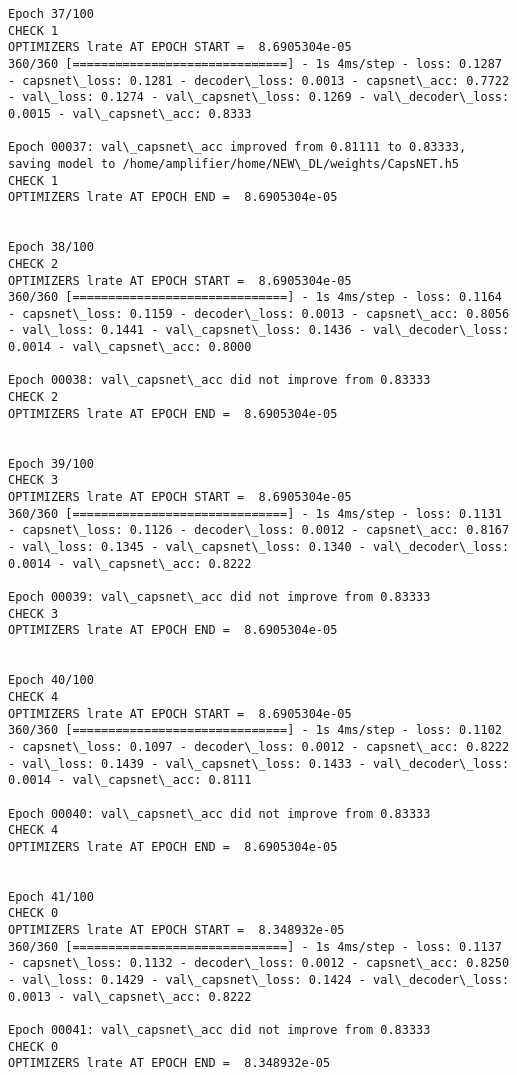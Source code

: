 \documentclass[11pt]{article}
\begin{document}
\begin{Verbatim}[commandchars=\\\{\}]
Epoch 37/100
CHECK 1
OPTIMIZERS lrate AT EPOCH START =  8.6905304e-05
360/360 [==============================] - 1s 4ms/step - loss: 0.1287 - capsnet\_loss: 0.1281 - decoder\_loss: 0.0013 - capsnet\_acc: 0.7722 - val\_loss: 0.1274 - val\_capsnet\_loss: 0.1269 - val\_decoder\_loss: 0.0015 - val\_capsnet\_acc: 0.8333

Epoch 00037: val\_capsnet\_acc improved from 0.81111 to 0.83333, saving model to /home/amplifier/home/NEW\_DL/weights/CapsNET.h5
CHECK 1
OPTIMIZERS lrate AT EPOCH END =  8.6905304e-05 


Epoch 38/100
CHECK 2
OPTIMIZERS lrate AT EPOCH START =  8.6905304e-05
360/360 [==============================] - 1s 4ms/step - loss: 0.1164 - capsnet\_loss: 0.1159 - decoder\_loss: 0.0013 - capsnet\_acc: 0.8056 - val\_loss: 0.1441 - val\_capsnet\_loss: 0.1436 - val\_decoder\_loss: 0.0014 - val\_capsnet\_acc: 0.8000

Epoch 00038: val\_capsnet\_acc did not improve from 0.83333
CHECK 2
OPTIMIZERS lrate AT EPOCH END =  8.6905304e-05 


Epoch 39/100
CHECK 3
OPTIMIZERS lrate AT EPOCH START =  8.6905304e-05
360/360 [==============================] - 1s 4ms/step - loss: 0.1131 - capsnet\_loss: 0.1126 - decoder\_loss: 0.0012 - capsnet\_acc: 0.8167 - val\_loss: 0.1345 - val\_capsnet\_loss: 0.1340 - val\_decoder\_loss: 0.0014 - val\_capsnet\_acc: 0.8222

Epoch 00039: val\_capsnet\_acc did not improve from 0.83333
CHECK 3
OPTIMIZERS lrate AT EPOCH END =  8.6905304e-05 


Epoch 40/100
CHECK 4
OPTIMIZERS lrate AT EPOCH START =  8.6905304e-05
360/360 [==============================] - 1s 4ms/step - loss: 0.1102 - capsnet\_loss: 0.1097 - decoder\_loss: 0.0012 - capsnet\_acc: 0.8222 - val\_loss: 0.1439 - val\_capsnet\_loss: 0.1433 - val\_decoder\_loss: 0.0014 - val\_capsnet\_acc: 0.8111

Epoch 00040: val\_capsnet\_acc did not improve from 0.83333
CHECK 4
OPTIMIZERS lrate AT EPOCH END =  8.6905304e-05 


Epoch 41/100
CHECK 0
OPTIMIZERS lrate AT EPOCH START =  8.348932e-05
360/360 [==============================] - 1s 4ms/step - loss: 0.1137 - capsnet\_loss: 0.1132 - decoder\_loss: 0.0012 - capsnet\_acc: 0.8250 - val\_loss: 0.1429 - val\_capsnet\_loss: 0.1424 - val\_decoder\_loss: 0.0013 - val\_capsnet\_acc: 0.8222

Epoch 00041: val\_capsnet\_acc did not improve from 0.83333
CHECK 0
OPTIMIZERS lrate AT EPOCH END =  8.348932e-05 



\end{Verbatim}
\end{document}
